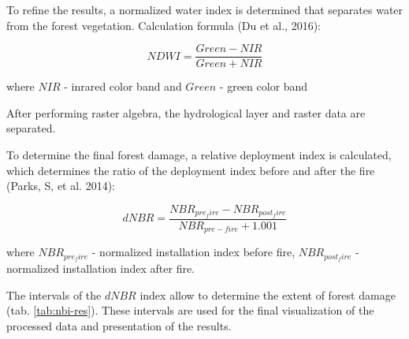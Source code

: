 	To refine the results, a normalized water index is determined that separates water from the forest vegetation. Calculation formula (Du et al., 2016):
	
	\begin{equation}
	NDWI = \dfrac{Green - NIR}{Green + NIR}
	\end{equation}
	
	where $NIR$ - inrared color band and $Green$ - green color band
	
	After performing raster algebra, the hydrological layer and raster data are separated.
	
	To determine the final forest damage, a relative deployment index is calculated, which determines the ratio of the deployment index before and after the fire (Parks, S, et al. 2014):
	
	\begin{equation}
	\label{eq:dnbr}
	dNBR = \dfrac{NBR_{pre_fire} - NBR_{post_fire}}{NBR_{pre-fire} + 1.001}
	\end{equation}
	
	where $NBR_{pre_fire}$ - normalized installation index before fire, $NBR_{post_fire}$ - normalized installation index after fire.
	
	The intervals of the $dNBR$ index allow to determine the extent of forest damage (tab. \ref{tab:nbi-res}). These intervals are used for the final visualization of the processed data and presentation of the results.
	
